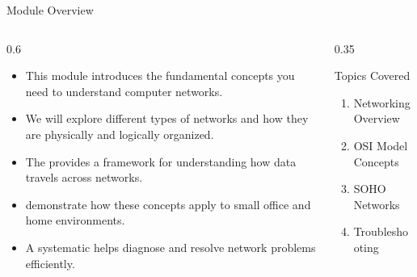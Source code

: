 \documentclass[aspectratio=169]{beamer}  %
\begin{document}
\begin{frame}{Module Overview}
    \begin{columns}[T]
        \begin{column}{0.6\textwidth}
            \begin{itemize}
                \item This module introduces the fundamental concepts you need to understand computer networks.
                \item We will explore different types of networks and how they are physically and logically organized.
                \item The  provides a framework for understanding how data travels across networks.
                \item {} demonstrate how these concepts apply to small office and home environments.
                \item A systematic  helps diagnose and resolve network problems efficiently.
            \end{itemize}
        \end{column}
        \begin{column}{0.35\textwidth}
            \begin{block}{Topics Covered}
                \begin{enumerate}
                    \item Networking Overview
                    \item OSI Model Concepts
                    \item SOHO Networks
                    \item Troubleshooting
                \end{enumerate}
            \end{block}
        \end{column}
    \end{columns}
\end{frame}

\end{document}
